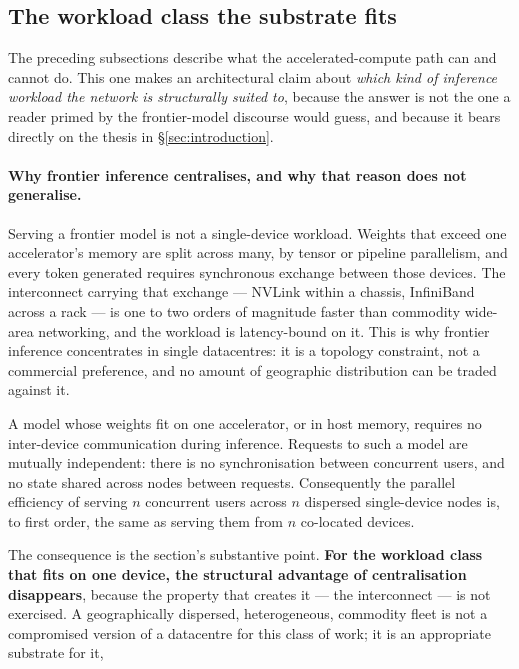 \subsection{The workload class the substrate fits}
\label{sec:ac-workload-fit}

The preceding subsections describe what the accelerated-compute path can and cannot do. This one makes
an architectural claim about \emph{which kind of inference workload the network is structurally suited
to}, because the answer is not the one a reader primed by the frontier-model discourse would guess, and
because it bears directly on the thesis in \S\ref{sec:introduction}.

\paragraph{Why frontier inference centralises, and why that reason does not generalise.}
Serving a frontier model is not a single-device workload. Weights that exceed one accelerator's memory
are split across many, by tensor or pipeline parallelism, and every token generated requires
synchronous exchange between those devices. The interconnect carrying that exchange --- NVLink within
a chassis, InfiniBand across a rack --- is one to two orders of magnitude faster than commodity
wide-area networking, and the workload is latency-bound on it. This is why frontier inference
concentrates in single datacentres: it is a topology constraint, not a commercial preference, and no
amount of geographic distribution can be traded against it.

\begin{property}
\label{prop:ac-interconnect}
\srcinferred{} A model whose weights fit on one accelerator, or in host memory, requires no inter-device
communication during inference. Requests to such a model are mutually independent: there is no
synchronisation between concurrent users, and no state shared across nodes between requests.
Consequently the parallel efficiency of serving $n$ concurrent users across $n$ dispersed single-device
nodes is, to first order, the same as serving them from $n$ co-located devices.
\end{property}

\noindent The consequence is the section's substantive point. \textbf{For the workload class that fits
on one device, the structural advantage of centralisation disappears}, because the property that
creates it --- the interconnect --- is not exercised. A geographically dispersed, heterogeneous,
commodity fleet is not a compromised version of a datacentre for this class of work; it is an
appropriate substrate for it, 

